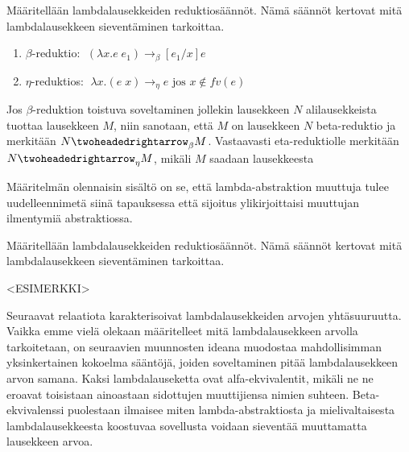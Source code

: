 \par

Määritellään lambdalausekkeiden reduktiosäännöt. Nämä säännöt kertovat mitä lambdalausekkeen sieventäminen tarkoittaa.   

\begin{maar}
	\begin{enumerate}		
		\item $\beta$-reduktio: $\; (\lambda x.e \; e_{1}) \rightarrow_{\beta} [e_{1} / x]e$
		\item $\eta$-reduktios: $\; \lambda x.(e \; x) \rightarrow_{\eta} e \text{ jos } x \notin fv(e)$
	\end{enumerate}
	Jos $\beta$-reduktion toistuva soveltaminen jollekin lausekkeen $N$ alilausekkeista tuottaa lausekkeen $M$, niin sanotaan, että $M$ on lausekkeen $N$ beta-reduktio ja merkitään $N \twoheadedrightarrow_{\beta} M$. Vastaavasti eta-reduktiolle merkitään $N \twoheadedrightarrow_{\eta} M$, mikäli $M$ saadaan lausekkeesta      
\end{maar}
Määritelmän olennaisin sisältö on se, että lambda-abstraktion muuttuja tulee uudelleennimetä siinä tapauksessa että sijoitus ylikirjoittaisi muuttujan ilmentymiä abstraktiossa.    

\par

Määritellään lambdalausekkeiden reduktiosäännöt. Nämä säännöt kertovat mitä lambdalausekkeen sieventäminen tarkoittaa.     

\par

\begin{esim}
<ESIMERKKI>
\end{esim}

\par

Seuraavat relaatiota karakterisoivat lambdalausekkeiden arvojen yhtäsuuruutta. Vaikka emme vielä olekaan määritelleet mitä lambdalausekkeen arvolla tarkoitetaan, on seuraavien muunnosten ideana muodostaa mahdollisimman yksinkertainen kokoelma sääntöjä, joiden soveltaminen pitää lambdalausekkeen arvon samana. Kaksi lambdalauseketta ovat alfa-ekvivalentit, mikäli ne ne eroavat toisistaan ainoastaan sidottujen muuttijiensa nimien suhteen. Beta-ekvivalenssi puolestaan ilmaisee miten lambda-abstraktiosta ja mielivaltaisesta lambdalausekkeesta koostuvaa sovellusta voidaan sieventää muuttamatta lausekkeen arvoa. 

